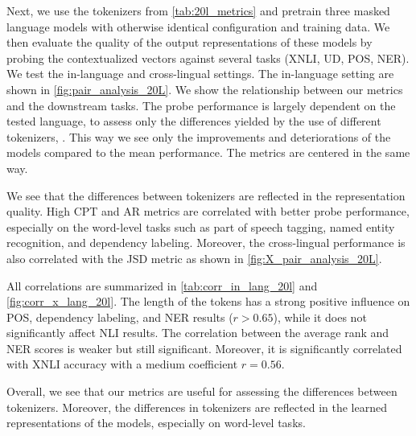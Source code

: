 Next, we use the tokenizers from \autoref{tab:20l_metrics} and pretrain three masked language models with otherwise identical configuration and training data.
We then evaluate the quality of the output representations of these models by probing the contextualized vectors against several tasks (XNLI, UD, POS, NER). We test the in-language and cross-lingual settings. The in-language setting are shown in \autoref{fig:pair_analysis_20L}. We show the relationship between our metrics and the downstream tasks.
The probe performance is largely dependent on the tested language, to assess only the differences yielded by the use of different tokenizers, .
 This way we see only the improvements and deteriorations of the models compared to the mean performance. The metrics are centered in the same way. 

We see that the differences between tokenizers are reflected in the representation quality. High CPT and AR metrics are correlated with better probe performance, especially on the word-level tasks such as part of speech tagging, named entity recognition, and dependency labeling. Moreover, the cross-lingual performance is also correlated with the JSD metric as shown in \autoref{fig:X_pair_analysis_20L}.

 

All correlations are summarized in \autoref{tab:corr_in_lang_20l} and \autoref{fig:corr_x_lang_20l}. The length of the tokens has a strong positive influence on POS, dependency labeling, and NER results ($r > 0.65$), while it does not significantly affect NLI results. The correlation between the average rank and NER scores is weaker but still significant. Moreover, it is significantly correlated with XNLI accuracy with a medium coefficient $r = 0.56$. 

Overall, we see that our metrics are useful for assessing the differences between tokenizers. Moreover, the differences in tokenizers are reflected in the learned representations of the models, especially on word-level tasks.


